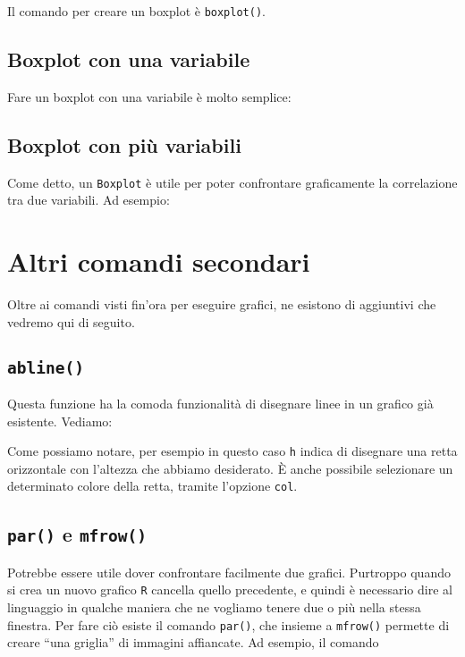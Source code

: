 Il comando per creare un boxplot è \texttt{boxplot()}.

\subsection{Boxplot con una variabile}

Fare un boxplot con una variabile è molto semplice:



\subsection{Boxplot con più variabili}

Come detto, un \texttt{Boxplot} è utile per poter confrontare graficamente la 
correlazione tra due variabili. Ad esempio:



\section{Altri comandi secondari}

Oltre ai comandi visti fin'ora per eseguire grafici, ne esistono di aggiuntivi
che vedremo qui di seguito.

\subsection{\texttt{abline()}}

Questa funzione ha la comoda funzionalità di disegnare linee in un grafico già
esistente. Vediamo:



Come possiamo notare, per esempio in questo caso \texttt{h} indica di disegnare
una retta orizzontale con l'altezza che abbiamo desiderato.
È anche possibile selezionare un determinato colore della retta, tramite
l'opzione \texttt{col}.

\subsection{\texttt{par()} e \texttt{mfrow()}}

Potrebbe essere utile dover confrontare facilmente due grafici. Purtroppo 
quando si crea un nuovo grafico \texttt{R} cancella quello precedente, e quindi 
è necessario dire al linguaggio in qualche maniera che ne vogliamo tenere due o 
più nella stessa finestra.
Per fare ciò esiste il comando \texttt{par()}, che insieme a \texttt{mfrow()} 
permette di creare ``una griglia'' di immagini affiancate.
Ad esempio, il comando

